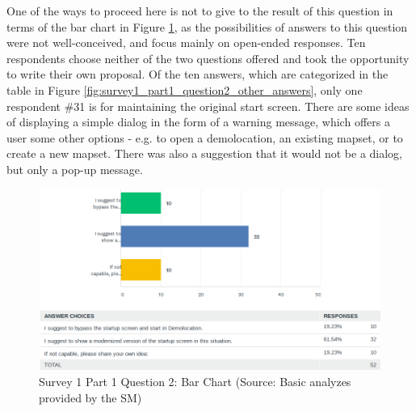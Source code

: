 \documentclass[a4paper,10pt,twoside]{article}
\begin{document}
One of the ways to proceed here is not to give to the result of this
question in terms of the bar chart in Figure
\ref{fig:survey1_part1_question2_histogram_sm}, as the possibilities
of answers to this question were not well-conceived, and focus mainly
on open-ended responses. Ten respondents choose neither of the two
questions offered and took the opportunity to write their own
proposal. Of the ten answers, which are categorized in the table in
Figure \ref{fig:survey1_part1_question2_other_answers}, only one
respondent \#31 is for maintaining the original start screen. There
are some ideas of displaying a simple dialog in the form of a warning
message, which offers a user some other options - e.g. to open a
demolocation, an existing mapset, or to create a new mapset. There was
also a suggestion that it would not be a dialog, but only a pop-up
message.

\vspace{0.3cm}
\begin{figure}[hbt!] 
\begin{center}
\includegraphics[width=17cm]{../surveys/analyzed_data/survey1_part1_question2_histogram_sm.png} 
\caption[Survey 1 Part 1 Question 2: Bar Chart]{Survey 1 Part 1 Question 2: Bar Chart (Source: Basic analyzes provided by the SM)}
\label{fig:survey1_part1_question2_histogram_sm}
\end{center}
\end{figure}
\end{document}
